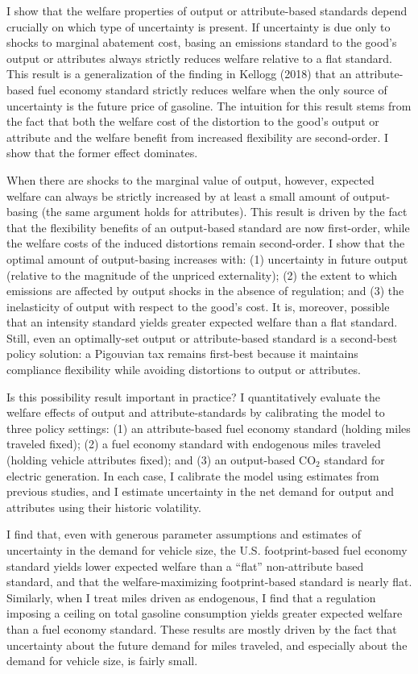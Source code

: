 \documentclass[12pt]{article}
\begin{document}
I show that the welfare properties of output or attribute-based standards depend crucially on which type of uncertainty is present. If uncertainty is due only to shocks to marginal abatement cost, basing an emissions standard to the good's output or attributes always strictly reduces welfare relative to a flat standard. This result is a generalization of the finding in Kellogg (2018) that an attribute-based fuel economy standard strictly reduces welfare when the only source of uncertainty is the future price of gasoline. The intuition for this result stems from the fact that both the welfare cost of the distortion to the good's output or attribute and the welfare benefit from increased flexibility are second-order. I show that the former effect dominates.

When there are shocks to the marginal value of output, however, expected welfare can always be strictly increased by at least a small amount of output-basing (the same argument holds for attributes). This result is driven by the fact that the flexibility benefits of an output-based standard are now first-order, while the welfare costs of the induced distortions remain second-order. I show that the optimal amount of output-basing increases with: (1) uncertainty in future output (relative to the magnitude of the unpriced externality); (2) the extent to which emissions are affected by output shocks in the absence of regulation; and (3) the inelasticity of output with respect to the good's cost. It is, moreover, possible that an intensity standard yields greater expected welfare than a flat standard. Still, even an optimally-set output or attribute-based standard is a second-best policy solution: a Pigouvian tax remains first-best because it maintains compliance flexibility while avoiding distortions to output or attributes.

Is this possibility result important in practice? I quantitatively evaluate the welfare effects of output and attribute-standards by calibrating the model to three policy settings: (1) an attribute-based fuel economy standard (holding miles traveled fixed); (2) a fuel economy standard with endogenous miles traveled (holding vehicle attributes fixed); and (3) an output-based CO$_{\text{2}}$ standard for electric generation. In each case, I calibrate the model using estimates from previous studies, and I estimate uncertainty in the net demand for output and attributes using their historic volatility.

I find that, even with generous parameter assumptions and estimates of uncertainty in the demand for vehicle size, the U.S. footprint-based fuel economy standard yields lower expected welfare than a ``flat'' non-attribute based standard, and that the welfare-maximizing footprint-based standard is nearly flat. Similarly, when I treat miles driven as endogenous, I find that a regulation imposing a ceiling on total gasoline consumption yields greater expected welfare than a fuel economy standard. These results are mostly driven by the fact that uncertainty about the future demand for miles traveled, and especially about the demand for vehicle size, is fairly small. 
\end{document}
